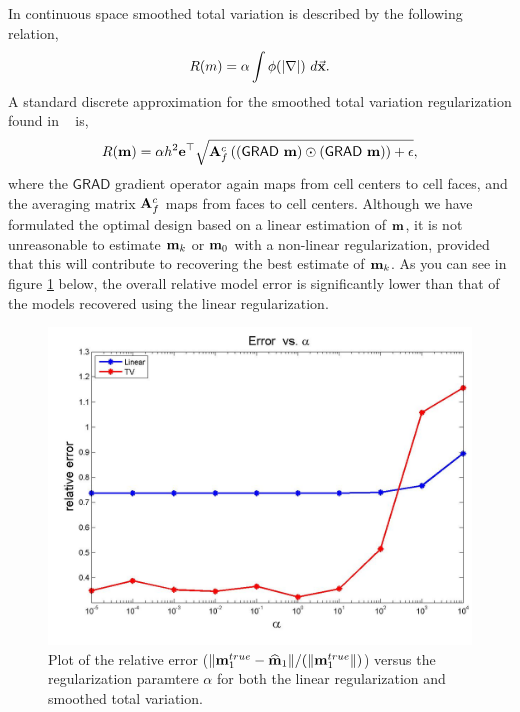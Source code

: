 \documentclass[11pt]{article}
\newcommand{\bfA}	{{\bf{A}}}
\newcommand{\bfe}	{{\bf{e}}}
\newcommand{\bfm}	{{\bf{m}}}
\newcommand{\bfmhat}    {{\widehat{\bfm}}}
\newcommand {\vx}    {\vec {\bf x}}
\newcommand{\grad}	{\ensuremath {{\bf{ \nabla}}}}
\newcommand{\GRADh}  {{\textsf{GRAD}}} %
\renewcommand{\bfmhat}	{\widehat{\bf m}}
\begin{document}
{In continuous space smoothed total variation is described by the following relation,
\begin{equation}
		R(m) = \alpha \int  \phi(|\grad |) \ d\vx.
\end{equation} 
A standard discrete 
approximation for the smoothed total variation regularization found in ~\cite{ahh} is, 
\begin{equation}
\label{regsd}
R(\bfm) = \alpha h^2 \bfe^{\top} \sqrt{ \bfA_{f}^{c} \left( (\GRADh\ \bfm) \odot (\GRADh\ \bfm) \right)  + \epsilon},
\end{equation}
where the $\GRADh$ gradient operator again maps from cell centers to cell faces, and the averaging matrix $\bfA_{f}^{c}$ maps from faces to cell centers. 
Although we have formulated the optimal design based on a linear estimation of $\bfm$, it is not unreasonable to estimate $\bfm_k$ or $\bfm_0$ with a non-linear regularization, provided that this will contribute to recovering the best estimate of $\bfm_k$. As you can see in figure \ref{fig:erro1} below, the overall relative model error is significantly lower than that of the models recovered using the linear regularization. 
%
\begin{figure}[!h]
\begin{center}
\iwidth=180mm
\includegraphics[width=.8\iwidth]{figures/newFigs/exp2-error1}
\end{center}
\caption{Plot of the relative error ($\|\bfm_1^{true}-\bfmhat_1\|/(    \|\bfm^{true}_1\|)$) versus the regularization paramtere $\alpha$ for both the linear regularization and smoothed total variation. }
	\label{fig:erro1}
\end{figure} 








}
\end{document}
